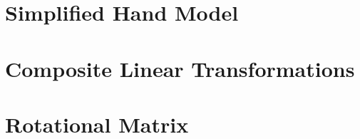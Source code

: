 \section{Simplified Hand Model}
	
	
\section{Composite Linear Transformations}




\section{Rotational Matrix}





